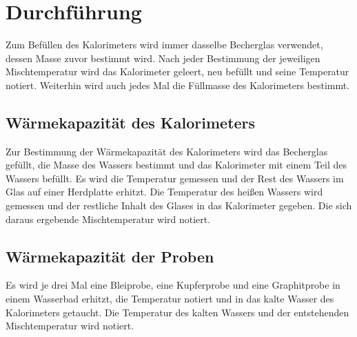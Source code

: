 

\section{Durchführung}
\label{sec:Durchführung}

Zum Befüllen des Kalorimeters wird immer dasselbe Becherglas verwendet, dessen Masse zuvor bestimmt wird. Nach jeder Bestimmung der jeweiligen Mischtemperatur wird das Kalorimeter geleert, neu befüllt und seine Temperatur notiert. Weiterhin wird auch jedes Mal die Füllmasse des Kalorimeters bestimmt.
\subsection{Wärmekapazität des Kalorimeters}
Zur Bestimmung der Wärmekapazität des Kalorimeters wird das Becherglas gefüllt, die Masse des Wassers bestimmt und das Kalorimeter mit einem Teil des Wassers befüllt. Es wird die Temperatur gemessen und der Rest des Wassers im Glas auf einer Herdplatte erhitzt. Die Temperatur des heißen Wassers wird gemessen und der restliche Inhalt des Glases in das Kalorimeter gegeben. Die sich daraus ergebende Mischtemperatur wird notiert.
\subsection{Wärmekapazität der Proben}
Es wird je drei Mal eine Bleiprobe, eine Kupferprobe und eine Graphitprobe in einem Wasserbad erhitzt, die Temperatur notiert und in das kalte Wasser des Kalorimeters getaucht. Die Temperatur des kalten Wassers und der entstehenden Mischtemperatur wird notiert.
